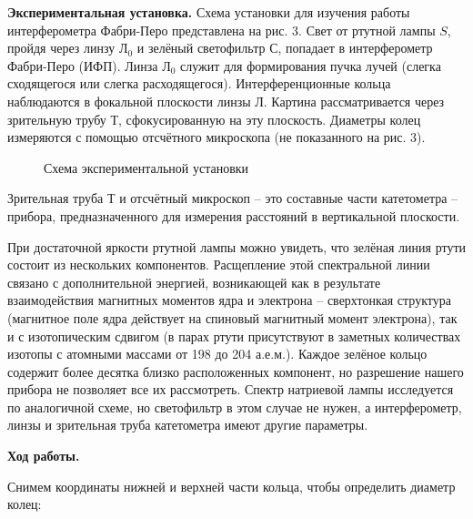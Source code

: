 \documentclass[14pt]{article}
\begin{document}
\vspace{0.5cm}
\textbf{Экспериментальная установка.} Схема установки для изучения работы интерферометра Фабри-Перо представлена на рис. 3.
Свет от ртутной лампы $S$, пройдя через линзу Л$_0$ и зелёный светофильтр С, попадает в интерферометр Фабри-Перо (ИФП). Линза
Л$_0$ служит для формирования пучка лучей (слегка сходящегося или слегка расходящегося). Интерференционные кольца наблюдаются в
фокальной плоскости линзы Л. Картина рассматривается через зрительную трубу Т, сфокусированную на эту плоскость. Диаметры колец
измеряются с помощью отсчётного микроскопа (не показанного на рис. 3).

\begin{figure}[H]
	\caption{Схема экспериментальной установки}
	\label{fig:image}
\end{figure}

Зрительная труба Т и отсчётный микроскоп -- это составные части катетометра -- прибора, предназначенного для измерения расстояний
в вертикальной плоскости.

При достаточной яркости ртутной лампы можно увидеть, что зелёная линия ртути состоит из нескольких компонентов. Расщепление этой
спектральной линии связано с дополнительной энергией, возникающей как в результате взаимодействия магнитных моментов ядра и электрона
-- сверхтонкая структура (магнитное поле ядра действует на спиновый магнитный момент электрона), так и с изотопическим сдвигом
(в парах ртути присутствуют в заметных количествах изотопы с атомными массами от 198 до 204 а.е.м.). Каждое зелёное кольцо содержит
более десятка близко расположенных компонент, но разрешение нашего прибора не позволяет все их рассмотреть. Спектр натриевой лампы
исследуется по аналогичной схеме, но светофильтр в этом случае не нужен, а интерферометр, линзы и зрительная труба катетометра имеют
другие параметры.

\vspace{2cm}
\textbf{Ход работы.}

Снимем координаты нижней и верхней части кольца, чтобы определить диаметр колец:
\end{document}
